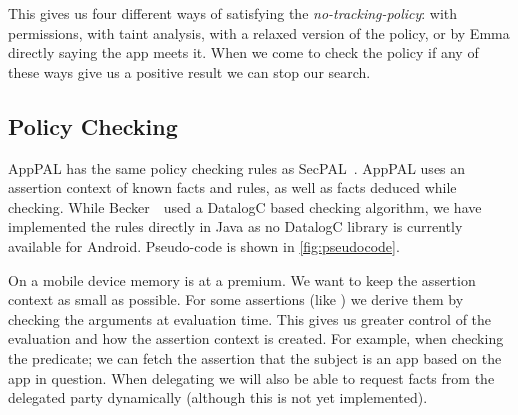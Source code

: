 \documentclass[]{llncs}
\begin{document}
This gives us four different ways of satisfying the \emph{no-tracking-policy}:
  with permissions,
  with taint analysis,
  with a relaxed version of the policy,
  or by Emma directly saying the app meets it.
When we come to check the policy if any of these ways give us a positive result we can stop our search.


\subsection{Policy Checking}
\label{ssec:eval}

AppPAL has the same policy checking rules as SecPAL~\cite{Becker:2006vh}.
AppPAL uses an assertion context of known facts and rules, as well as facts deduced while checking.
While Becker~\etal~used a DatalogC based checking algorithm, we have implemented the rules directly in Java as no DatalogC library is currently available for Android.
Pseudo-code is shown in \autoref{fig:pseudocode}.

On a mobile device memory is at a premium.
We want to keep the assertion context as small as possible.
For some assertions (like ) we derive them by checking the arguments at evaluation time.
This gives us greater control of the evaluation and how the assertion context is created.
For example, when checking the  predicate;
  we can fetch the assertion that the subject is an app based on the app in question.
When delegating we will also be able to request facts from the delegated party dynamically (although this is not yet implemented).
\end{document}
